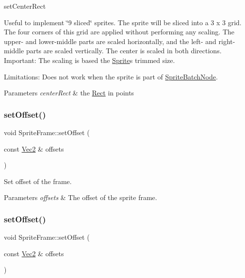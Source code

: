 set\+Center\+Rect

Useful to implement \char`\"{}9 sliced\char`\"{} sprites. The sprite will be sliced into a 3 x 3 grid. The four corners of this grid are applied without performing any scaling. The upper-\/ and lower-\/middle parts are scaled horizontally, and the left-\/ and right-\/middle parts are scaled vertically. The center is scaled in both directions. Important\+: The scaling is based the \hyperlink{classSprite}{Sprite}\textquotesingle{}s trimmed size.

Limitations\+: Does not work when the sprite is part of {\ttfamily \hyperlink{classSpriteBatchNode}{Sprite\+Batch\+Node}}. 
\begin{DoxyParams}{Parameters}
{\em center\+Rect} & the \hyperlink{classRect}{Rect} in points \\
\hline
\end{DoxyParams}
\mbox{\label{classSpriteFrame_a124c5d3b77a94966cf6c5ae428f9733c}} 
\subsubsection{\texorpdfstring{set\+Offset()}{setOffset()}\hspace{0.1cm}{\footnotesize\ttfamily [1/2]}}
{\footnotesize\ttfamily void Sprite\+Frame\+::set\+Offset (\begin{DoxyParamCaption}\item[{const \hyperlink{classVec2}{Vec2} \&}]{offsets }\end{DoxyParamCaption})}

Set offset of the frame.


\begin{DoxyParams}{Parameters}
{\em offsets} & The offset of the sprite frame. \\
\hline
\end{DoxyParams}
\mbox{\label{classSpriteFrame_a124c5d3b77a94966cf6c5ae428f9733c}} 
\subsubsection{\texorpdfstring{set\+Offset()}{setOffset()}\hspace{0.1cm}{\footnotesize\ttfamily [2/2]}}
{\footnotesize\ttfamily void Sprite\+Frame\+::set\+Offset (\begin{DoxyParamCaption}\item[{const \hyperlink{classVec2}{Vec2} \&}]{offsets }\end{DoxyParamCaption})}

